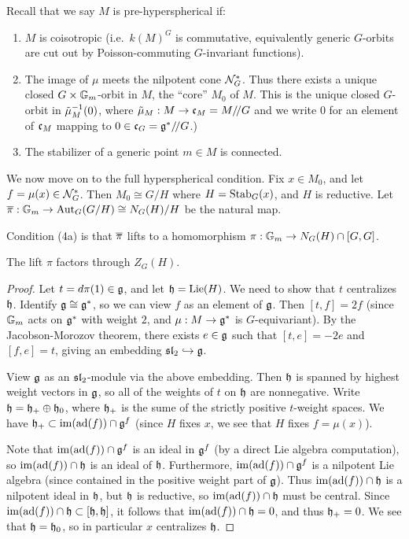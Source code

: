\documentclass{article}
\begin{document}
Recall that we say $M$ is pre-hyperspherical if:
\begin{enumerate}
	\item $M$ is coisotropic (i.e.\ $k(M)^G$ is commutative, equivalently generic $G$-orbits are cut out by Poisson-commuting $G$-invariant functions).
	\item The image of $\mu$ meets the nilpotent cone $\mathcal{N}_G^*$.
		Thus there exists a unique closed $G \times \mathbb{G}_m$-orbit in $M$, the ``core'' $M_0$ of $M$.
		This is the unique closed $G$-orbit in $\tilde{\mu}_M^{-1}(0)$, where $\tilde{\mu}_M: M \to \mathfrak{c}_M = M /\mkern-3mu/ G$ and we write $0$ for an element of $\mathfrak{c}_M$ mapping to $0 \in \mathfrak{c}_G = \mathfrak{g}^* /\mkern-3mu/ G$.)
	\item The stabilizer of a generic point $m \in M$ is connected.
\end{enumerate}

We now move on to the full hyperspherical condition.
Fix $x \in M_0$, and let $f = \mu(x) \in \mathcal{N}_G^*$.
Then $M_0 \cong G / H$ where $H = \operatorname{Stab}_G(x)$, and $H$ is reductive.
Let $\overline{\pi}: \mathbb{G}_m \to \operatorname{Aut}_G(G/H) \cong N_G(H) / H$ be the natural map.

Condition (4a) is that $\overline{\pi}$ lifts to a homomorphism $\pi: \mathbb{G}_m \to N_G(H) \cap [G, G]$.

\begin{prop}
	The lift $\pi$ factors through $Z_G(H)$.
\end{prop}

\begin{proof}
	Let $t = d\pi(1) \in \mathfrak{g}$, and let $\mathfrak{h} = \operatorname{Lie}(H)$.
	We need to show that $t$ centralizes $\mathfrak{h}$.
	Identify $\mathfrak{g} \cong \mathfrak{g}^*$, so we can view $f$ as an element of $\mathfrak{g}$.
	Then $[t, f] = 2f$ (since $\mathbb{G}_m$ acts on $\mathfrak{g}^*$ with weight $2$, and $\mu: M \to \mathfrak{g}^*$ is $G$-equivariant).
	By the Jacobson-Morozov theorem, there exists $e \in \mathfrak{g}$ such that $[t, e] = -2e$ and $[f, e] = t$, giving an embedding $\mathfrak{sl}_2 \hookrightarrow \mathfrak{g}$.
	
	View $\mathfrak{g}$ as an $\mathfrak{sl}_2$-module via the above embedding.
	Then $\mathfrak{h}$ is spanned by highest weight vectors in $\mathfrak{g}$, so all of the weights of $t$ on $\mathfrak{h}$ are nonnegative.
	Write $\mathfrak{h} = \mathfrak{h}_+ \oplus \mathfrak{h}_0$, where $\mathfrak{h}_+$ is the sume of the strictly positive $t$-weight spaces.
	We have $\mathfrak{h}_+ \subset \operatorname{im} (\operatorname{ad}(f)) \cap \mathfrak{g}^f$ (since $H$ fixes $x$, we see that $H$ fixes $f = \mu(x)$).

	Note that $\operatorname{im} (\operatorname{ad}(f)) \cap \mathfrak{g}^f$ is an ideal in $\mathfrak{g}^f$ (by a direct Lie algebra computation), so $\operatorname{im}(\operatorname{ad}(f)) \cap \mathfrak{h}$ is an ideal of $\mathfrak{h}$.
	Furthermore, $\operatorname{im} (\operatorname{ad}(f)) \cap \mathfrak{g}^f$ is a nilpotent Lie algebra (since contained in the positive weight part of $\mathfrak{g}$).
	Thus $\operatorname{im} (\operatorname{ad}(f)) \cap \mathfrak{h}$ is a nilpotent ideal in $\mathfrak{h}$, but $\mathfrak{h}$ is reductive, so $\operatorname{im} (\operatorname{ad}(f)) \cap \mathfrak{h}$ must be central.
	Since $\operatorname{im} (\operatorname{ad}(f)) \cap \mathfrak{h} \subset [\mathfrak{h}, \mathfrak{h}]$, it follows that $\operatorname{im}(\operatorname{ad}(f)) \cap \mathfrak{h} = 0$, and thus $\mathfrak{h}_+ = 0$.
	We see that $\mathfrak{h} = \mathfrak{h}_0$, so in particular $x$ centralizes $\mathfrak{h}$.
\end{proof}
\end{document}
